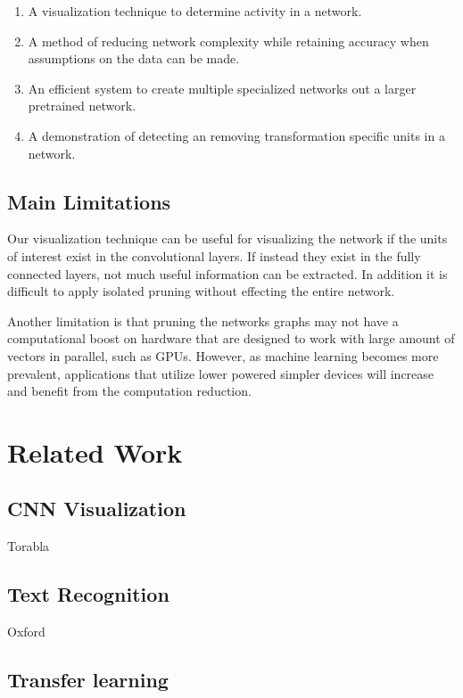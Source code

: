 \documentclass[10pt,twocolumn,letterpaper]{article}
\begin{document}
\begin{enumerate}
\item A visualization technique to determine activity in a network.

\item A method of reducing network complexity while retaining accuracy when assumptions on the data can be made.

\item An efficient system to create multiple specialized networks out a larger pretrained network.

\item A demonstration of detecting an removing transformation specific units in a network.
\end{enumerate}

\subsection{Main Limitations}
Our visualization technique can be useful for visualizing the network if the units of interest exist in the convolutional layers. If instead they exist in the fully connected layers, not much useful information can be extracted. In addition it is difficult to apply isolated pruning without effecting the entire network.

Another limitation is that pruning the networks graphs may not have a computational boost on hardware that are designed to work with large amount of vectors in parallel, such as GPUs. However, as machine learning becomes more prevalent, applications that utilize lower powered simpler devices will increase and benefit from the computation reduction.

\section{Related Work}


\subsection{CNN Visualization}

Torabla

\subsection{Text Recognition}

Oxford

\subsection{Transfer learning}
\end{document}

